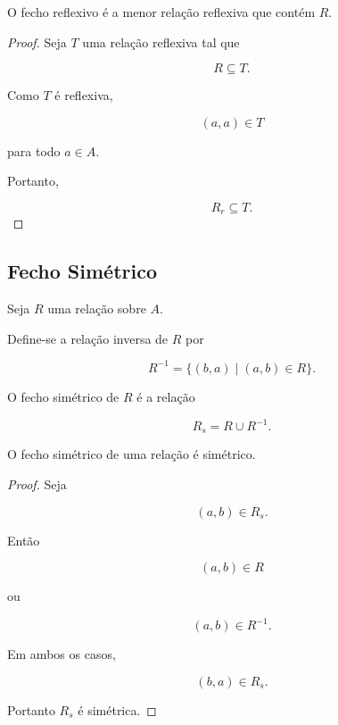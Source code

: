 \documentclass[../../main]{subfiles}
\begin{document}
\begin{prop}
	\label{prop:matematica:relacoes:fechos:minimalidade-fecho-reflexivo}

	O fecho reflexivo é a menor relação reflexiva que contém \(R\).

\end{prop}

\begin{proof}

	Seja \(T\) uma relação reflexiva tal que

	\[
		R \subseteq T.
	\]

	Como \(T\) é reflexiva,

	\[
		(a,a)\in T
	\]

	para todo \(a\in A\).

	Portanto,

	\[
		R_r \subseteq T.
	\]

\end{proof}

\subsection{Fecho Simétrico}

\begin{defn}
	\label{def:matematica:relacoes:fechos:relacao-inversa}

	Seja \(R\) uma relação sobre \(A\).

	Define-se a relação inversa de \(R\) por

	\[
		R^{-1}
		=
		\{
		(b,a)
		\mid
		(a,b)\in R
		\}.
	\]

\end{defn}

\begin{defn}
	\label{def:matematica:relacoes:fechos:fecho-simetrico}

	O fecho simétrico de \(R\) é a relação

	\[
		R_s
		=
		R
		\cup
		R^{-1}.
	\]

\end{defn}

\begin{prop}
	\label{prop:matematica:relacoes:fechos:fecho-simetrico-simetrico}

	O fecho simétrico de uma relação é simétrico.

\end{prop}

\begin{proof}

	Seja

	\[
		(a,b)\in R_s.
	\]

	Então

	\[
		(a,b)\in R
	\]

	ou

	\[
		(a,b)\in R^{-1}.
	\]

	Em ambos os casos,

	\[
		(b,a)\in R_s.
	\]

	Portanto \(R_s\) é simétrica.

\end{proof}
\end{document}
